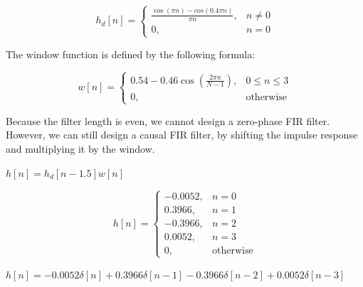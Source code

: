 \documentclass[fleqn]{article}
\begin{document}
\begin{enumerate}[nolistsep]
		\begin{equation*}
			h_d[n] =
			\begin{cases}
				\frac{\cos{({\pi}n)} - cos{(0.4{\pi}n)}}{{\pi}n}, & n \neq 0 \\
				0, & n = 0
			\end{cases}
		\end{equation*}
		
		The window function is defined by the following formula:
		
		\begin{equation*}
			w[n] =
			\begin{cases}
				0.54 - 0.46\cos{\left(\frac{2{\pi}n}{N - 1}\right)}, & 0 \leq n \leq 3 \\
				0, & \text{otherwise}
			\end{cases}
		\end{equation*}
		
		Because the filter length is even, we cannot design a zero-phase FIR filter. However, we can still design a causal FIR filter, by shifting the impulse response and multiplying it by the window.
		
		$h[n] = h_d[n - 1.5]w[n]$
		
		\begin{equation*}
			h[n] =
			\begin{cases}
				-0.0052, & n = 0 \\
				0.3966, & n = 1 \\
				-0.3966, & n = 2 \\
				0.0052, & n = 3\\
				0, & \text{otherwise}
			\end{cases}
		\end{equation*}
			
		$h[n] = -0.0052\delta[n] + 0.3966\delta[n-1] - 0.3966\delta[n-2] + 0.0052\delta[n-3]$
	\end{enumerate}
\end{document}
